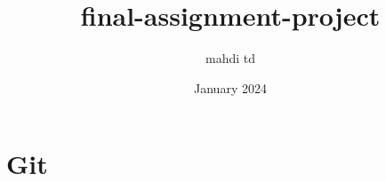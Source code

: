 \documentclass{article}
\title{final-assignment-project}
\author{mahdi td}
\date{January 2024}
\begin{document}
\maketitle
\newpage
\section{Git}
\end{document}

